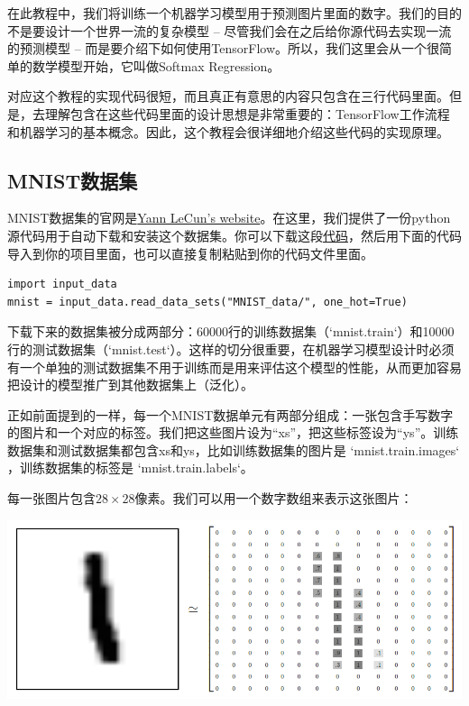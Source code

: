 \documentclass[a4paper,11pt,twoside]{ctexbook}
\begin{document}
在此教程中，我们将训练一个机器学习模型用于预测图片里面的数字。我们的目的不是要设计一个世界一流的复杂模型 -- 尽管我们会在之后给你源代码去实现一流的预测模型 -- 而是要介绍下如何使用TensorFlow。所以，我们这里会从一个很简单的数学模型开始，它叫做Softmax Regression。

对应这个教程的实现代码很短，而且真正有意思的内容只包含在三行代码里面。但是，去理解包含在这些代码里面的设计思想是非常重要的：TensorFlow工作流程和机器学习的基本概念。因此，这个教程会很详细地介绍这些代码的实现原理。

\subsection {MNIST数据集}

MNIST数据集的官网是\href{http://yann.lecun.com/exdb/mnist/}{Yann LeCun's website}。在这里，我们提供了一份python源代码用于自动下载和安装这个数据集。你可以下载这段\href{https://tensorflow.googlesource.com/tensorflow/+/master/tensorflow/examples/tutorials/mnist/input_data.py}{代码}，然后用下面的代码导入到你的项目里面，也可以直接复制粘贴到你的代码文件里面。

\begin{lstlisting}
import input_data
mnist = input_data.read_data_sets("MNIST_data/", one_hot=True)
\end{lstlisting}

下载下来的数据集被分成两部分：60000行的训练数据集（`mnist.train`）和10000行的测试数据集（`mnist.test`）。这样的切分很重要，在机器学习模型设计时必须有一个单独的测试数据集不用于训练而是用来评估这个模型的性能，从而更加容易把设计的模型推广到其他数据集上（泛化）。

正如前面提到的一样，每一个MNIST数据单元有两部分组成：一张包含手写数字的图片和一个对应的标签。我们把这些图片设为“xs”，把这些标签设为“ys”。训练数据集和测试数据集都包含xs和ys，比如训练数据集的图片是 `mnist.train.images` ，训练数据集的标签是 `mnist.train.labels`。

每一张图片包含$ 28 \times 28$像素。我们可以用一个数字数组来表示这张图片：

\begin{center}
\includegraphics[width=.85\textwidth]{../SOURCE/images/MNIST-Matrix.png}
\end{center}
\end{document}

